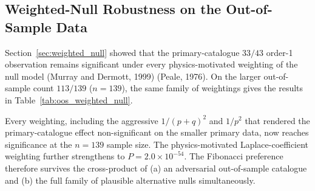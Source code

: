 \documentclass[twocolumn,11pt]{article}
\begin{document}
\subsection{Weighted-Null Robustness on the Out-of-Sample Data}
\label{sec:oos_weighted_null}

Section~\ref{sec:weighted_null} showed that the primary-catalogue
$33/43$ order-1 observation remains significant under every
physics-motivated weighting of the null model
(Murray and Dermott, 1999) (Peale, 1976).
On the larger out-of-sample count $113/139$ ($n=139$), the same
family of weightings gives the results in
Table~\ref{tab:oos_weighted_null}.

\begin{table}[h]
\centering
\small
\caption{Binomial $P(X \geq 113 \mid n=139)$ on the out-of-sample
order-1 data under the null weightings of
Table~\ref{tab:weighted_null}.}
\label{tab:oos_weighted_null}
\end{table}

Every weighting, including the aggressive $1/(p+q)^2$ and $1/p^2$
that rendered the primary-catalogue effect non-significant on the
smaller primary data, now reaches significance at the $n=139$
sample size. The physics-motivated Laplace-coefficient weighting
\citep{murray1999} further strengthens to $P = 2.0 \times 10^{-54}$.
The Fibonacci preference therefore survives the cross-product of
(a) an adversarial out-of-sample catalogue and (b) the full family
of plausible alternative nulls simultaneously.
\end{document}
